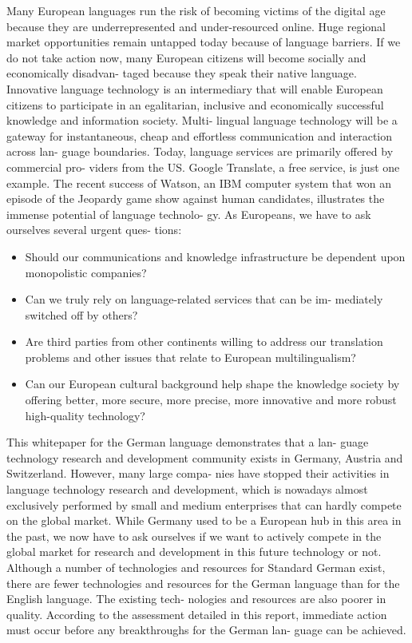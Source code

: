 \documentclass[]{../metanetpaper}
\begin{document}
			Many European languages run the risk of becoming victims of the
digital age because they are underrepresented and under-resourced
online. Huge regional market opportunities remain untapped today
because of language barriers. If we do not take action now, many
European citizens will become socially and economically disadvan-
taged because they speak their native language.
Innovative language technology is an intermediary that will enable
European citizens to participate in an egalitarian, inclusive and
economically successful knowledge and information society. Multi-
lingual language technology will be a gateway for instantaneous,
cheap and effortless communication and interaction across lan-
guage boundaries.
Today, language services are primarily offered by commercial pro-
viders from the US. Google Translate, a free service, is just one
example. The recent success of Watson, an IBM computer system
that won an episode of the Jeopardy game show against human
candidates, illustrates the immense potential of language technolo-
gy. As Europeans, we have to ask ourselves several urgent ques-
tions:
\\
\begin {itemize}
\item Should our communications and knowledge infrastructure be
dependent upon monopolistic companies?
\item Can we truly rely on language-related services that can be im-
mediately switched off by others?
\item Are third parties from other continents willing to address our
translation problems and other issues that relate to European
multilingualism?
\item Can our European cultural background help shape the
knowledge society by offering better, more secure, more precise,
more innovative and more robust high-quality technology?
\end {itemize}
This whitepaper for the German language demonstrates that a lan-
guage technology research and development community exists in
Germany, Austria and Switzerland. However, many large compa-
nies have stopped their activities in language technology research
and development, which is nowadays almost exclusively performed
by small and medium enterprises that can hardly compete on the
global market. While Germany used to be a European hub in this
area in the past, we now have to ask ourselves if we want to actively
compete in the global market for research and development in this
future technology or not.
Although a number of technologies and resources for Standard
German exist, there are fewer technologies and resources for the
German language than for the English language. The existing tech-
nologies and resources are also poorer in quality.
According to the assessment detailed in this report, immediate
action must occur before any breakthroughs for the German lan-
guage can be achieved.\\
\end{document}
